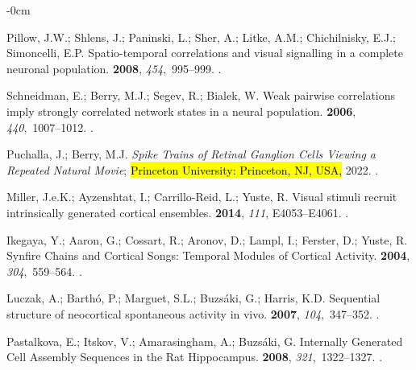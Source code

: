 \documentclass[brainsci, %
               review,accept,pdftex,moreauthors
               ]{Definitions/mdpi}
\begin{document}
\begin{adjustwidth}{-\extralength}{0cm}
\begin{thebibliography}{999}
Pillow, J.W.; Shlens, J.; Paninski, L.; Sher, A.; Litke, A.M.; Chichilnisky,
  E.J.; Simoncelli, E.P.
\newblock Spatio-temporal correlations and visual signalling in a complete
  neuronal population.
 {\bf 2008}, {\em 454},~995--999.
.

Schneidman, E.; Berry, M.J.; Segev, R.; Bialek, W.
\newblock Weak pairwise correlations imply strongly correlated network states
  in a neural population.
 {\bf 2006}, {\em 440},~1007--1012.
.

Puchalla, J.; Berry, M.J.
\newblock \emph{Spike {Trains} of {Retinal} {Ganglion} {Cells} {Viewing} a {Repeated}
  {Natural} {Movie}}; \hl{Princeton University: Princeton, NJ, USA,} %
  {2022}.
.

Miller, J.e.K.; Ayzenshtat, I.; Carrillo-Reid, L.; Yuste, R.
\newblock Visual stimuli recruit intrinsically generated cortical ensembles.
 {\bf 2014},
  {\em 111}, E4053--E4061.
.

Ikegaya, Y.; Aaron, G.; Cossart, R.; Aronov, D.; Lampl, I.; Ferster, D.; Yuste,
  R.
\newblock Synfire {Chains} and {Cortical} {Songs}: {Temporal} {Modules} of
  {Cortical} {Activity}.
 {\bf 2004}, {\em 304},~559--564.
.

Luczak, A.; Barthó, P.; Marguet, S.L.; Buzsáki, G.; Harris, K.D.
\newblock Sequential structure of neocortical spontaneous activity in vivo.
 {\bf 2007},
  {\em 104},~347--352.
.

Pastalkova, E.; Itskov, V.; Amarasingham, A.; Buzsáki, G.
\newblock Internally {Generated} {Cell} {Assembly} {Sequences} in the {Rat}
  {Hippocampus}.
 {\bf 2008}, {\em 321},~1322--1327.
.


\end{thebibliography}
\end{adjustwidth}
\end{document}
